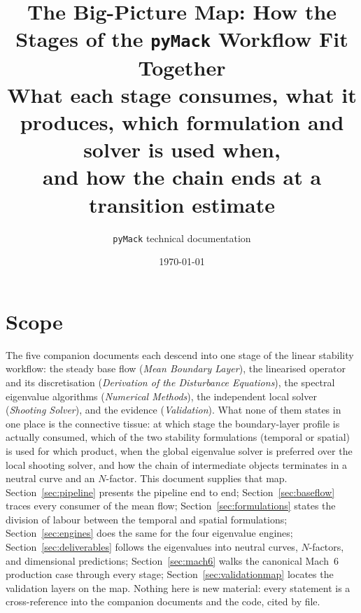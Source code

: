 \documentclass[11pt]{article}
\title{\textbf{The Big-Picture Map: How the Stages of the \texttt{pyMack} Workflow Fit Together}\\[3pt]
\large What each stage consumes, what it produces, which formulation and solver is used when,\\
and how the chain ends at a transition estimate}
\author{\texttt{pyMack} technical documentation}
\date{\today}
\begin{document}
\maketitle
\tableofcontents
\bigskip

\section{Scope}\label{sec:scope}
The five companion documents each descend into one stage of the linear stability workflow: the
steady base flow (\emph{Mean Boundary Layer}), the linearised operator and its discretisation
(\emph{Derivation of the Disturbance Equations}), the spectral eigenvalue algorithms
(\emph{Numerical Methods}), the independent local solver (\emph{Shooting Solver}), and the
evidence (\emph{Validation}). What none of them states in one place is the connective tissue: at which
stage the boundary-layer profile is actually consumed, which of the two stability formulations
(temporal or spatial) is used for which product, when the global eigenvalue solver is preferred
over the local shooting solver, and how the chain of intermediate objects terminates in a
neutral curve and an $N$-factor. This document supplies that map. Section~\ref{sec:pipeline}
presents the pipeline end to end; Section~\ref{sec:baseflow} traces every consumer of the mean
flow; Section~\ref{sec:formulations} states the division of labour between the temporal and
spatial formulations; Section~\ref{sec:engines} does the same for the four eigenvalue engines;
Section~\ref{sec:deliverables} follows the eigenvalues into neutral curves, $N$-factors, and
dimensional predictions; Section~\ref{sec:mach6} walks the canonical Mach~6 production case
through every stage; Section~\ref{sec:validationmap} locates the validation layers on the map.
Nothing here is new material: every statement is a cross-reference into the companion documents
and the code, cited by file.

\end{document}
